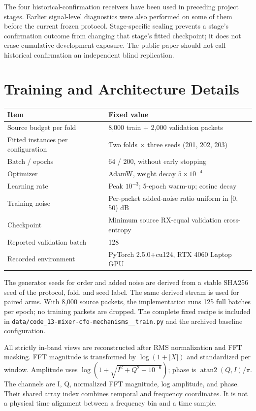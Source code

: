 \documentclass[11pt]{article}
\begin{document}
The four historical-confirmation receivers have been used in preceding project stages. Earlier signal-level diagnostics were also performed on some of them before the current frozen protocol. Stage-specific sealing prevents a stage's confirmation outcome from changing that stage's fitted checkpoint; it does not erase cumulative development exposure. The public paper should not call historical confirmation an independent blind replication.

\section{Training and Architecture Details}
\begin{table}[htbp]\centering
\begin{tabular}{ll}\toprule
Item & Fixed value\\\midrule
Source budget per fold & 8,000 train + 2,000 validation packets\\
Fitted instances per configuration & Two folds $\times$ three seeds (201, 202, 203)\\
Batch / epochs & 64 / 200, without early stopping\\
Optimizer & AdamW, weight decay $5\times10^{-4}$\\
Learning rate & Peak $10^{-3}$; 5-epoch warm-up; cosine decay\\
Training noise & Per-packet added-noise ratio uniform in [0, 50) dB\\
Checkpoint & Minimum source RX-equal validation cross-entropy\\
Reported validation batch & 128\\
Recorded environment & PyTorch 2.5.0+cu124, RTX 4060 Laptop GPU\\\bottomrule
\end{tabular}
\end{table}

The generator seeds for order and added noise are derived from a stable SHA256 seed of the protocol, fold, and seed label. The same derived stream is used for paired arms. With 8,000 source packets, the implementation runs 125 full batches per epoch; no training packets are dropped. The complete fixed recipe is included in \texttt{data/code\_13-mixer-cfo-mechanisms\_\_train.py} and the archived baseline configuration.

All strictly in-band views are reconstructed after RMS normalization and FFT masking. FFT magnitude is transformed by $\log(1+|X|)$ and standardized per window. Amplitude uses $\log(1+\sqrt{I^2+Q^2+10^{-6}})$; phase is $\operatorname{atan2}(Q,I)/\pi$. The channels are I, Q, normalized FFT magnitude, log amplitude, and phase. Their shared array index combines temporal and frequency coordinates. It is not a physical time alignment between a frequency bin and a time sample.
\end{document}
